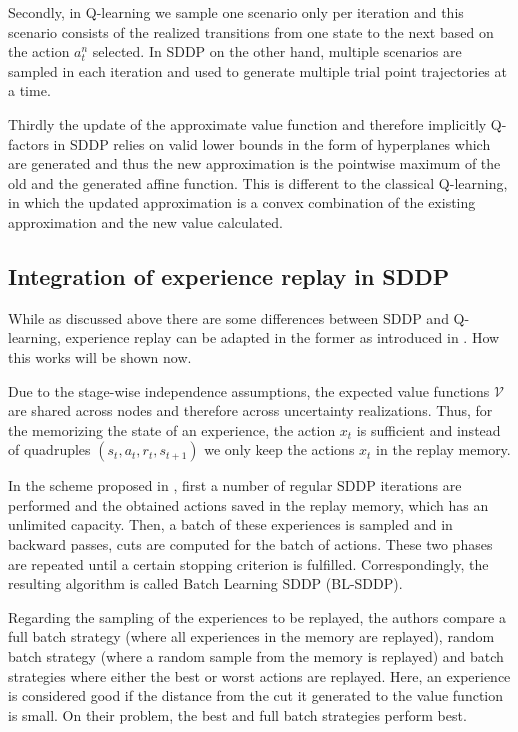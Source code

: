 \documentclass[a4paper,12pt]{article}
\begin{document}
Secondly, in Q-learning we sample one scenario only per iteration and this scenario consists of the realized transitions from one state to the next based on the action $a^n_t$ selected. In SDDP on the other hand, multiple scenarios are sampled in each iteration and used to generate multiple trial point trajectories at a time.

Thirdly the update of the approximate value function and therefore implicitly Q-factors in SDDP relies on valid lower bounds in the form of hyperplanes which are generated and thus the new approximation is the pointwise maximum of the old and the generated affine function. This is different to the classical Q-learning, in which the updated approximation is a convex combination of the existing approximation and the new value calculated.


\subsection{Integration of experience replay in SDDP}
While as discussed above there are some differences between SDDP and Q-learning, experience replay can be adapted in the former as introduced in \cite{avila2023batch}.   How this works will be shown now.

Due to the stage-wise independence assumptions, the expected value functions $\mathcal{V}$ are shared across nodes and therefore across uncertainty realizations. Thus, for the memorizing the state of an experience, the action $x_t$ is sufficient and instead of quadruples $(s_t, a_t, r_t, s_{t+1})$ we only keep the actions $x_t$ in the replay memory.

In the scheme proposed in \cite{avila2023batch}, first a number of regular SDDP iterations are performed and the obtained actions saved in the replay memory, which has an unlimited capacity. Then, a batch of these experiences is sampled and in backward passes, cuts are computed for the batch of actions. These two phases are repeated until a certain stopping criterion is fulfilled.
Correspondingly, the resulting algorithm is called Batch Learning SDDP (BL-SDDP).

Regarding the sampling of the experiences to be replayed, the authors compare a full batch strategy (where all experiences in the memory are replayed), random batch strategy (where a random sample from the memory is replayed) and batch strategies where either the best or worst actions are replayed. Here, an experience is considered good if the distance from the cut it generated to the value function is small. On their problem, the best and full batch strategies perform best.
\end{document}
